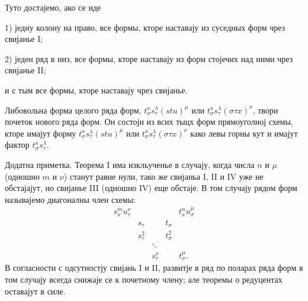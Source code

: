 ﻿\documentclass[11pt]{article}
\begin{document}
Туто достајемо, ако се иде

1) једну колону на право, все формы, кторе наставају из суседных форм чрез свијанье I;

2) једен ряд в низ, все формы, кторе наставају из форм стојечих над ними чрез свијанье II;

и с тым все формы, кторе наставају чрез свијанье.

Либовольна форма целого ряда форм, $t_\sigma^\kappa s_\tau^\lambda(stu)^\mu$ или $t_\sigma^\kappa s_\tau^\lambda(\sigma\tau x)^\nu$, твори почеток нового ряда форм. Он состоји из всих тыцх форм прямоуголној схемы, кторе имајут форму $t_\sigma^\kappa s_\tau^\lambda(stu)^\mu$ или $t_\sigma^\kappa s_\tau^\lambda(\sigma\tau x)^\nu$ како левы горны кут и имајут фактор $t_\sigma^\kappa s_\tau^\lambda$.

Додатна приметка. Теорема I има изкльученье в случају, когда числа $n$ и $\mu$ (одношно $m$ и $\nu$) станут равне нули, тако же свијаньа I, II и IV уже не обстајајут, но свијанье III (одношно IV) еще обстаје. В том случају рядом форм называјемо диагоналны член схемы:
\[
\begin{array}{ccccc}
s_x^m u_\tau^\nu &&&& t_x^n u_\sigma^\mu\\
& s_\tau && t_\sigma &\\
& s_\tau^2 && t_\sigma^2 &\\
&&\ddots&&\\
&&s_\tau^\nu && t_\sigma^\mu .
\end{array}
\]
В согласности с одсутностју свијань I и II, развитје в ряд по поларах ряда форм в том случају всегда снижаје се к почетному члену; але теоремы о редуцентах оставајут в силе.
\end{document}
